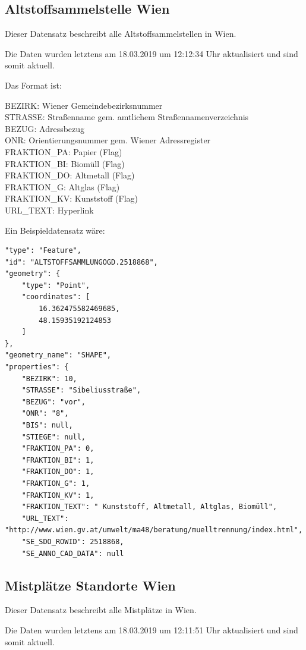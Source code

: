 \documentclass[12pt, a4paper]{scrreprt}
\begin{document}
\subsection{Altstoffsammelstelle Wien \cite{alstoffsammelstellen}}
    Dieser Datensatz beschreibt alle Altstoffsammelstellen in Wien.

    Die Daten wurden letztens am 18.03.2019 um 12:12:34 Uhr aktualisiert und sind somit aktuell.

    Das Format ist:
    \begin{tcolorbox}
        BEZIRK: Wiener Gemeindebezirksnummer\\
        STRASSE: Straßenname gem. amtlichem Straßennamenverzeichnis\\
        BEZUG: Adressbezug\\
        ONR: Orientierungsnummer gem. Wiener Adressregister\\
        FRAKTION\_PA: Papier (Flag)\\
        FRAKTION\_BI: Biomüll (Flag)\\
        FRAKTION\_DO: Altmetall (Flag)\\
        FRAKTION\_G: Altglas (Flag)\\
        FRAKTION\_KV: Kunststoff (Flag)\\
        URL\_TEXT: Hyperlink
    \end{tcolorbox}
    
    Ein Beispieldatensatz wäre:
    \begin{lstlisting}
"type": "Feature",
"id": "ALTSTOFFSAMMLUNGOGD.2518868",
"geometry": {
    "type": "Point",
    "coordinates": [
        16.362475582469685,
        48.15935192124853
    ]
},
"geometry_name": "SHAPE",
"properties": {
    "BEZIRK": 10,
    "STRASSE": "Sibeliusstraße",
    "BEZUG": "vor",
    "ONR": "8",
    "BIS": null,
    "STIEGE": null,
    "FRAKTION_PA": 0,
    "FRAKTION_BI": 1,
    "FRAKTION_DO": 1,
    "FRAKTION_G": 1,
    "FRAKTION_KV": 1,
    "FRAKTION_TEXT": " Kunststoff, Altmetall, Altglas, Biomüll",
    "URL_TEXT": "http://www.wien.gv.at/umwelt/ma48/beratung/muelltrennung/index.html",
    "SE_SDO_ROWID": 2518868,
    "SE_ANNO_CAD_DATA": null
    \end{lstlisting}
\subsection{Mistplätze Standorte Wien \cite{mistplaetze}}
    Dieser Datensatz beschreibt alle Mistplätze in Wien.

    Die Daten wurden letztens am 18.03.2019 um 12:11:51 Uhr aktualisiert und sind somit aktuell.
\end{document}
